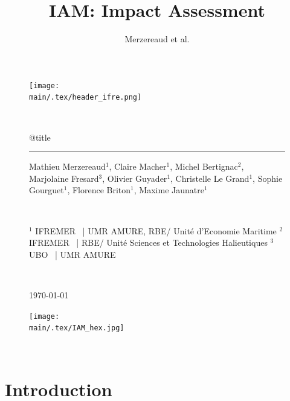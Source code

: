 \documentclass[12pt, colorinlistoftodos, notitlepage]{report}
\title{IAM: Impact Assessment}
\author{Merzereaud et al.}
\providecommand{\main}{.}  %
\newenvironment{not used}[1]{%
    \longtable{%
        |>{\centering$\displaystyle}A{#1}{1}<{$}%
        |}\hline\ignorespaces}{%
    \endlongtable\ignorespacesafterend}
\begin{document}
\thispagestyle{plain}

\begin{figure}[H]
    \texttt{[image: \\main/.tex/header\_ifre.png]}
    \par ~ \par
    \begin{minipage}{\textwidth}
        \begin{center}
            {\huge \csname @title\endcsname }
        \end{center}
        \rule{7em}{.4pt}\par
        Mathieu Merzereaud$^1$, Claire Macher$^1$, Michel Bertignac$^2$, Marjolaine Fresard$^3$, Olivier Guyader$^1$, Christelle Le Grand$^1$, Sophie Gourguet$^1$, Florence Briton$^1$, Maxime Jaunatre$^1$
        
        \par ~ \par
        $^1$ IFREMER ~| UMR AMURE, RBE/ Unité d'Economie Maritime \newline
        $^2$ IFREMER ~| RBE/ Unité Sciences et Technologies Halieutiques \newline
        $^3$ UBO ~| UMR AMURE
        \par ~ \par
        
        \begin{center}
            {\large \today }
            \vspace{10mm}

            \texttt{[image: \\main/.tex/IAM\_hex.jpg]}
        \end{center}

        
    \end{minipage}
\end{figure}
\vfill
\par ~ \par


\tableofcontents
\newpage
{}

\section*{Introduction}
\end{document}
